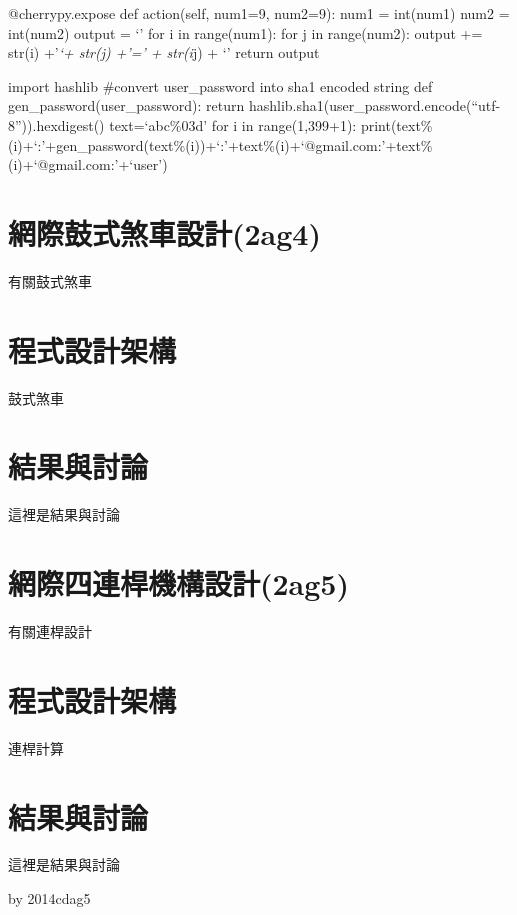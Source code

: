 \documentclass[]{article}
\begin{document}
@cherrypy.expose def action(self, num1=9, num2=9): num1 = int(num1) num2
= int(num2) output = `' for i in range(num1): for j in range(num2):
output += str(i) +'\emph{`+ str(j) +'=' + str(i}j) + `' return output

import hashlib \#convert user\_password into sha1 encoded string def
gen\_password(user\_password): return
hashlib.sha1(user\_password.encode(``utf-8'')).hexdigest()
text=`abc\%03d' for i in range(1,399+1):
print(text\%(i)+`:'+gen\_password(text\%(i))+`:'+text\%(i)+`@gmail.com:'+text\%(i)+`@gmail.com:'+`user')

\section{網際鼓式煞車設計(2ag4)}\label{ux7db2ux969bux9f13ux5f0fux715eux8ecaux8a2dux8a082ag4}

有關鼓式煞車

\section{程式設計架構}\label{ux7a0bux5f0fux8a2dux8a08ux67b6ux69cb-1}

鼓式煞車

\section{結果與討論}\label{ux7d50ux679cux8207ux8a0eux8ad6-2}

這裡是結果與討論

\section{網際四連桿機構設計(2ag5)}\label{ux7db2ux969bux56dbux9023ux687fux6a5fux69cbux8a2dux8a082ag5}

有關連桿設計

\section{程式設計架構}\label{ux7a0bux5f0fux8a2dux8a08ux67b6ux69cb-2}

連桿計算

\section{結果與討論}\label{ux7d50ux679cux8207ux8a0eux8ad6-3}

這裡是結果與討論

by 2014cdag5
\end{document}
